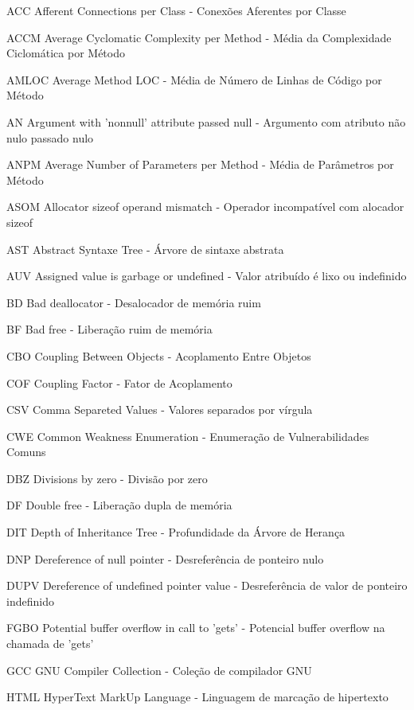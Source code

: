 \begin{siglas}
  \item[ACC] Afferent Connections per Class - Conexões Aferentes por Classe 
  \item[ACCM] Average Cyclomatic Complexity per Method - Média da Complexidade Ciclomática por Método
  \item[AMLOC] Average Method LOC - Média de Número de Linhas de Código por Método
  \item[AN] Argument with 'nonnull' attribute passed null - Argumento com atributo não nulo passado nulo
  \item[ANPM] Average Number of Parameters per Method - Média de Parâmetros por Método
  \item[ASOM] Allocator sizeof operand mismatch - Operador incompatível com alocador sizeof
  \item[AST] Abstract Syntaxe Tree - Árvore de sintaxe abstrata
  \item[AUV] Assigned value is garbage or undefined - Valor atribuído é lixo ou indefinido
  \item[BD] Bad deallocator - Desalocador de memória ruim
  \item[BF] Bad free - Liberação ruim de memória
  \item[CBO] Coupling Between Objects - Acoplamento Entre Objetos 
  \item[COF] Coupling Factor - Fator de Acoplamento
  \item[CSV] Comma Separeted Values - Valores separados por vírgula
  \item[CWE] Common Weakness Enumeration - Enumeração de Vulnerabilidades Comuns
  \item[DBZ] Divisions by zero - Divisão por zero
  \item[DF] Double free - Liberação dupla de memória
  \item[DIT] Depth of Inheritance Tree - Profundidade da Árvore de Herança 
  \item[DNP] Dereference of null pointer - Desreferência de ponteiro nulo
  \item[DUPV] Dereference of undefined pointer value - Desreferência de valor de ponteiro indefinido
  \item[FGBO] Potential buffer overflow in call to 'gets' - Potencial buffer overflow na chamada de 'gets'
  \item[GCC] GNU Compiler Collection - Coleção de compilador GNU
  \item[HTML] HyperText MarkUp Language - Linguagem de marcação de hipertexto

\end{siglas}
